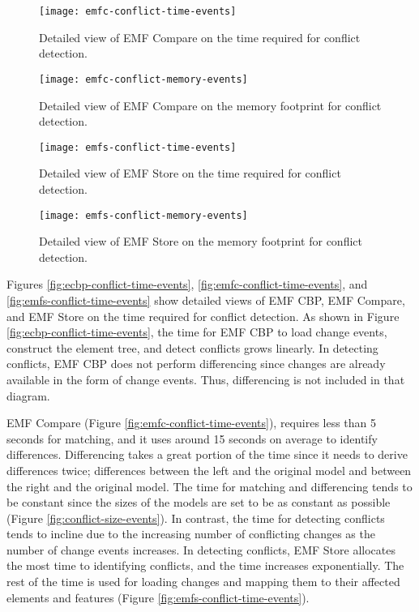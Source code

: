 \begin{figure*}[]
  \centering
  \begin{minipage}[t]{0.490\textwidth}
    \texttt{[image: emfc-conflict-time-events]}
    \caption{Detailed view of EMF Compare on the time required for conflict detection.}
    \label{fig:emfc-conflict-time-events}
  \end{minipage}
  \hfill
  \begin{minipage}[t]{0.490\textwidth}
    \texttt{[image: emfc-conflict-memory-events]}
    \caption{Detailed view of EMF Compare on the memory footprint for conflict detection.}
    \label{fig:emfc-conflict-memory-events}
  \end{minipage}
\end{figure*}

\begin{figure*}[]
  \begin{minipage}[t]{0.490\textwidth}
    \texttt{[image: emfs-conflict-time-events]}
    \caption{Detailed view of EMF Store on the time required for conflict detection.}
    \label{fig:emfs-conflict-time-events}
  \end{minipage}
  \hfill
  \begin{minipage}[t]{0.490\textwidth}
    \texttt{[image: emfs-conflict-memory-events]}
    \caption{Detailed view of EMF Store on the memory footprint for conflict detection.}
    \label{fig:emfs-conflict-memory-events}
  \end{minipage}
\end{figure*}

Figures \ref{fig:ecbp-conflict-time-events}, \ref{fig:emfc-conflict-time-events}, and \ref{fig:emfs-conflict-time-events} show detailed views of EMF CBP, EMF Compare, and EMF Store on the time required for conflict detection. As shown in Figure \ref{fig:ecbp-conflict-time-events}, the time for EMF CBP to load change events, construct the element tree, and detect conflicts grows linearly. In detecting conflicts, EMF CBP does not perform differencing since changes are already available in the form of change events. Thus, differencing is not included in that diagram.

EMF Compare (Figure \ref{fig:emfc-conflict-time-events}), requires less than 5 seconds for matching, and it uses around 15 seconds on average to identify differences. Differencing takes a great portion of the time since it needs to derive differences twice; differences between the left and the original model and between the right and the original model. The time for matching and differencing tends to be constant since the sizes of the models are set to be as constant as possible (Figure \ref{fig:conflict-size-events}). In contrast, the time for detecting conflicts tends to incline due to the increasing number of conflicting changes as the number of change events increases. In detecting conflicts, EMF Store allocates the most time to identifying conflicts, and the time increases exponentially. The rest of the time is used for loading changes and mapping them to their affected elements and features (Figure \ref{fig:emfs-conflict-time-events}).

